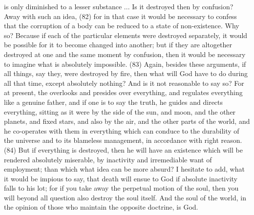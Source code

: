 is only diminished to a lesser substance ... Is it destroyed then by confusion? Away with such an
idea, (82) for in that case it would be necessary to confess that the corruption of a body can be
reduced to a state of non-existence. Why so? Because if each of the particular elements were
destroyed separately, it would be possible for it to become changed into another; but if they are
altogether destroyed at one and the same moment by confusion, then it would be necessary to
imagine what is absolutely impossible. (83) Again, besides these arguments, if all things, say they,
were destroyed by fire, then what will God have to do during all that time, except absolutely
nothing? And is it not reasonable to say so? For at present, the overlooks and presides over
everything, and regulates everything like a genuine father, and if one is to say the truth, he guides
and directs everything, sitting as it were by the side of the sun, and moon, and the other planets,
and fixed stars, and also by the air, and the other parts of the world, and he co-operates with them
in everything which can conduce to the durability of the universe and to its blameless management,
in accordance with right reason. (84) But if everything is destroyed, then he will have an existence
which will be rendered absolutely miserable, by inactivity and irremediable want of employment;
than which what idea can be more absurd? I hesitate to add, what it would be impious to say, that
death will ensue to God if absolute inactivity falls to his lot; for if you take away the perpetual motion
of the soul, then you will beyond all question also destroy the soul itself. And the soul of the world, in
the opinion of those who maintain the opposite doctrine, is God.


